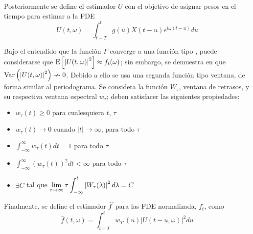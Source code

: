 Posteriormente se define el estimador $U$ con el objetivo de asignar pesos en el tiempo para estimar
a la FDE
\begin{equation*}
U(t,\omega) = \int_{t-T}^{t} g(u) X({t-u}) e^{i \omega (t-u)} du
\end{equation*}

Bajo el entendido que la función $\Gamma$ converge a una función tipo \dirac, puede 
considerarse que 
$\mathrm{E}\left[ \left| U(t,\omega) \right|^{2} \right] \approx f_t(\omega)$; sin embargo, se demuestra en \cite{Priestley66} 
que $\mathrm{Var}\left( \left| U(t,\omega) \right|^{2} \right) \nrightarrow 0$.
%
Debido a ello se usa una segunda función tipo ventana,
de forma similar al periodograma.
Se considera la función $W_\tau$, ventana de retrasos, y su respectiva ventana espectral 
$w_\tau$; deben satisfacer las siguientes propiedades:
\begin{itemize}
\item $w_{\tau}(t) \geq 0$ para cualesquiera $t$, $\tau$
\item $w_{\tau}(t) \rightarrow 0$ cuando $\lvert t \lvert \rightarrow \infty$, para todo $\tau$
\item $\displaystyle \int_{-\infty}^{\infty} w_{\tau}(t) dt = 1$ para todo $\tau$
\item $\displaystyle \int_{-\infty}^{\infty} \left( w_{\tau}(t) \right)^{2} dt < \infty$ para todo $\tau$
\item $\exists C$ tal que  
$\displaystyle \lim_{\tau\rightarrow\infty} \tau \int_{-\infty}^{t} \left|  W_{\tau}(\lambda)  \right|^{2} d\lambda = C$
\end{itemize}

Finalmente, se define el estimador $\widehat{ f }$ para las FDE normalizada, $f_t$, como
\begin{equation*}
\widehat{f}(t,\omega) = \int_{t-T}^{t} w_{T'}(u) \lvert U(t-u,\omega) \lvert^{2} du
\label{estimador_doble_ventana}
\end{equation*}

